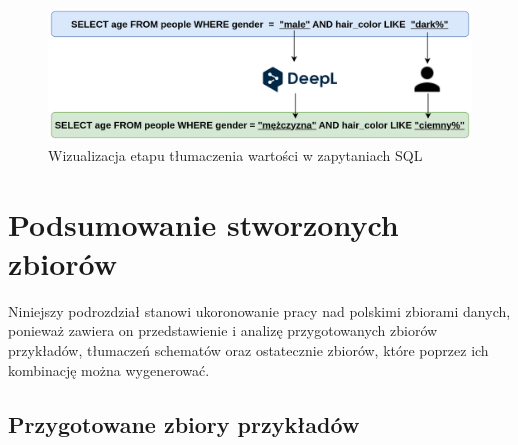 \begin{figure}[ht!]
  \centering
  \includegraphics[width=1.0\linewidth]{images/value_translation.png}
  \caption{Wizualizacja etapu tłumaczenia wartości w zapytaniach SQL}
  \label{fig:value-translation}
\end{figure}

\section{Podsumowanie stworzonych zbiorów}
Niniejszy podrozdział stanowi ukoronowanie pracy nad polskimi zbiorami danych, ponieważ zawiera on przedstawienie i analizę przygotowanych zbiorów przykładów, tłumaczeń schematów oraz ostatecznie zbiorów, które poprzez ich kombinację można wygenerować.

\subsection{Przygotowane zbiory przykładów}



